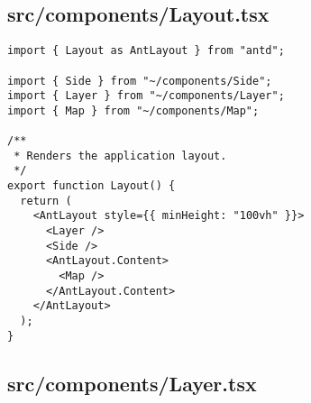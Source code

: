 \subsection{src/components/Layout.tsx}
\begin{verbatim}
import { Layout as AntLayout } from "antd";

import { Side } from "~/components/Side";
import { Layer } from "~/components/Layer";
import { Map } from "~/components/Map";

/**
 * Renders the application layout.
 */
export function Layout() {
  return (
    <AntLayout style={{ minHeight: "100vh" }}>
      <Layer />
      <Side />
      <AntLayout.Content>
        <Map />
      </AntLayout.Content>
    </AntLayout>
  );
}

\end{verbatim}
\subsection{src/components/Layer.tsx}

